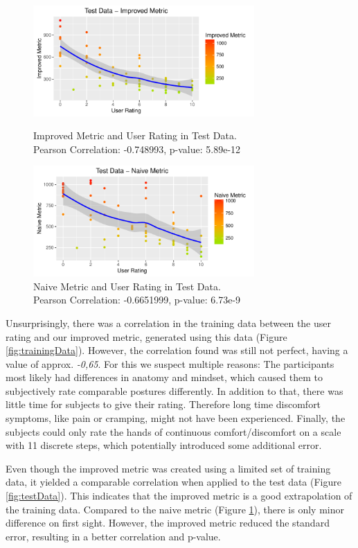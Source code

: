 \documentclass{sig-alternate-05-2015}
\begin{document}
\begin{figure}[t]
\centering
\includegraphics[width=8.45cm]{TestDataImproved}
\vspace{-20pt}
\caption{Improved Metric and User Rating in Test Data.\\
Pearson Correlation: -0.748993, p-value: 5.89e-12}
\label{fig:testData}

\includegraphics[width=8.45cm]{TestDataNaive}
\vspace{-20pt}
\caption{Naive Metric and User Rating in Test Data.\\
Pearson Correlation: -0.6651999, p-value: 6.73e-9}
\label{fig:testDataNaive}
\vspace{-10pt}
\end{figure}


Unsurprisingly, there was a correlation in the training data between the user rating and our improved metric, generated using this data (Figure \ref{fig:trainingData}). However, the correlation found was still not perfect, having a value of approx. \textsl{-0,65}. For this we suspect multiple reasons: 
The participants most likely had differences in anatomy and mindset, which caused them to subjectively rate comparable postures differently. In addition to that, there was little time for subjects to give their rating. Therefore long time discomfort symptoms, like pain or cramping, might not have been experienced. Finally, the subjects could only rate the hands of continuous comfort/discomfort on a scale with 11 discrete steps, which potentially introduced some additional error.

Even though the improved metric was created using a limited set of training data, it yielded a comparable correlation when applied to the test data (Figure \ref{fig:testData}). This indicates that the improved metric is a good extrapolation of the training data. Compared to the naive metric (Figure \ref{fig:testDataNaive}), there is only minor difference on first sight. However, the improved metric reduced the standard error, resulting in a better correlation and p-value.
\end{document}
